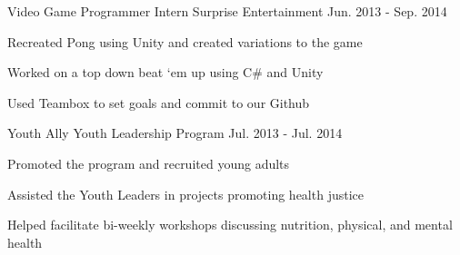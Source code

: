 \begin{cventries}
\iftrue
  \cventry
    {Video Game Programmer Intern} %
    {Surprise Entertainment} %
	{Jun. 2013 - Sep. 2014} %
    {} %
    {
      \begin{cvitems} %
        \item {Recreated Pong using Unity and created variations to the game}
        \item {Worked on a top down beat ‘em up using C\# and Unity}
        \item {Used Teambox to set goals and commit to our Github}
      \end{cvitems}
    }
\fi

\iftrue
  \cventry
    {Youth Ally} %
    {Youth Leadership Program} %
	{Jul. 2013 - Jul. 2014} %
    {} %
    {
      \begin{cvitems} %
        \item {Promoted the program and recruited young adults}
        \item {Assisted the Youth Leaders in projects promoting health justice}
        \item {Helped facilitate bi-weekly workshops discussing nutrition, physical, and mental health}
      \end{cvitems}
    }
\fi

\end{cventries}
